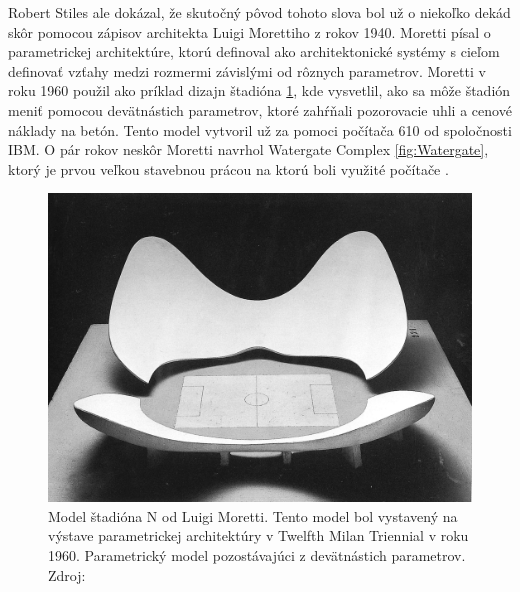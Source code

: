 Robert Stiles ale dokázal, že skutočný pôvod tohoto slova bol už o niekoľko dekád skôr pomocou zápisov architekta Luigi Morettiho z rokov 1940.  Moretti písal o parametrickej architektúre, ktorú definoval ako architektonické systémy s cieľom 
definovať vzťahy medzi rozmermi závislými od rôznych parametrov.
Moretti v roku 1960 použil ako príklad dizajn štadióna \ref{fig:morretiStadion}, kde vysvetlil, ako sa môže štadión meniť pomocou devätnástich parametrov, ktoré zahŕňali pozorovacie uhli a cenové náklady na betón. Tento model vytvoril už za pomoci počítača 610 od spoločnosti IBM\cite{doi:10.1002/ad.2019}. O pár rokov neskôr Moretti navrhol Watergate Complex \ref{fig:Watergate}, ktorý je prvou veľkou stavebnou prácou na ktorú boli využité počítače \cite{davis_2013}. 


\begin{figure}[H]
    \centering
    \includegraphics[width = \linewidth]{obrazky-figures/moretti_1.jpg}
    \caption{Model štadióna N od Luigi Moretti. Tento model bol vystavený na výstave parametrickej architektúry v Twelfth Milan Triennial v roku 1960. Parametrický model pozostávajúci z devätnástich parametrov. Zdroj:  \cite{davis_2013}}
    \label{fig:morretiStadion}
\end{figure}

